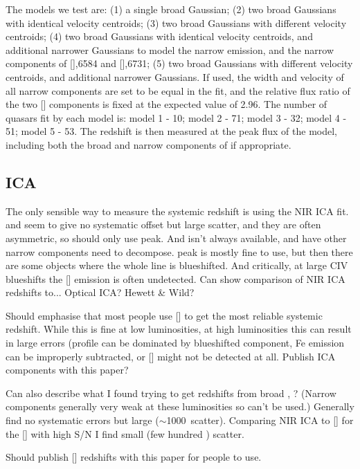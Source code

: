 The models we test are: (1) a single broad Gaussian; (2) two broad Gaussians with identical velocity centroids; (3) two broad Gaussians with different velocity centroids; (4) two broad Gaussians with identical velocity centroids, and additional narrower Gaussians to model the narrow \ha emission, and the narrow components of [],6584 and [],6731; (5) two broad Gaussians with different velocity centroids, and additional narrower Gaussians. 
If used, the width and velocity of all narrow components are set to be equal in the fit, and the relative flux ratio of the two [] components is fixed at the expected value of 2.96.
The number of quasars fit by each model is: model 1 - 10; model 2 - 71; model 3 - 32; model 4 - 51; model 5 - 53. 
The redshift is then measured at the peak flux of the \ha model, including both the broad and narrow components of \ha if appropriate. 

\subsection{ICA}

The only sensible way to measure the systemic redshift is using the NIR ICA fit. 
\ha and \hb seem to give no systematic offset but large scatter, and they are often asymmetric, so should only use peak. 
And \ha isn't always available, and have other narrow components need to decompose.
 peak is mostly fine to use, but then there are some objects where the whole line is blueshifted. 
And critically, at large CIV blueshifts the [] emission is often undetected. 
Can show comparison of NIR ICA redshifts to... Optical ICA? Hewett \& Wild? 

Should emphasise that most people use [] to get the most reliable systemic redshift. 
While this is fine at low luminosities, at high luminosities this can result in large errors (profile can be dominated by blueshifted component, Fe emission can be improperly subtracted, or [] might not be detected at all. 
Publish ICA components with this paper? 

Can also describe what I found trying to get redshifts from broad \hans, \hbns? (Narrow components generally very weak at these luminosities so can't be used.)
Generally find no systematic errors but large ($\sim$1000\kms\, scatter).
Comparing NIR ICA to [] for the [] with high S/N I find small (few hundred \kms) scatter. 

Should publish [] redshifts with this paper for people to use. 
 

